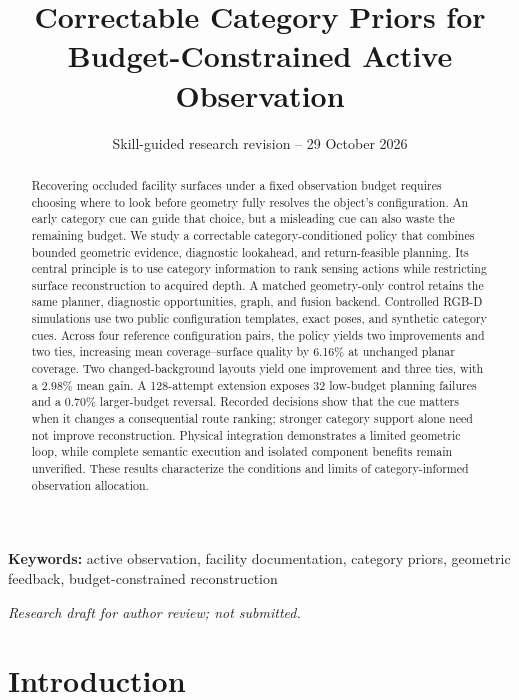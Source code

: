 \documentclass[11pt,a4paper]{article}
\providecommand{\hypertarget}[2]{#2}
\begin{document}
\title{Correctable Category Priors for Budget-Constrained Active Observation}
\author{}
\date{Skill-guided research revision -- 29 October 2026}
\maketitle
\begin{abstract}
Recovering occluded facility surfaces under a fixed observation budget requires choosing where to look before geometry fully resolves the object's configuration. An early category cue can guide that choice, but a misleading cue can also waste the remaining budget. We study a correctable category-conditioned policy that combines bounded geometric evidence, diagnostic lookahead, and return-feasible planning. Its central principle is to use category information to rank sensing actions while restricting surface reconstruction to acquired depth. A matched geometry-only control retains the same planner, diagnostic opportunities, graph, and fusion backend. Controlled RGB-D simulations use two public configuration templates, exact poses, and synthetic category cues. Across four reference configuration pairs, the policy yields two improvements and two ties, increasing mean coverage--surface quality by 6.16\% at unchanged planar coverage. Two changed-background layouts yield one improvement and three ties, with a 2.98\% mean gain. A 128-attempt extension exposes 32 low-budget planning failures and a 0.70\% larger-budget reversal. Recorded decisions show that the cue matters when it changes a consequential route ranking; stronger category support alone need not improve reconstruction. Physical integration demonstrates a limited geometric loop, while complete semantic execution and isolated component benefits remain unverified. These results characterize the conditions and limits of category-informed observation allocation.
\end{abstract}
\noindent\textbf{Keywords:} active observation, facility documentation, category priors, geometric feedback, budget-constrained reconstruction

\noindent\textit{Research draft for author review; not submitted.}

\hypertarget{introduction}{%
\section{Introduction}\label{introduction}}
\end{document}
